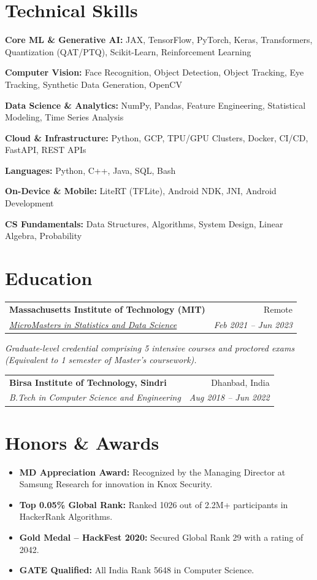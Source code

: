 \documentclass[10pt, letterpaper]{article}
\makeatletter
\newcommand{\resumeItem}[1]{
  \item\small{
    {#1 \vspace{-2pt}}
  }
}
\newcommand{\resumeSubheading}[4]{
  \vspace{-1pt}\item
    \begin{tabular*}{0.98\textwidth}[t]{l@{\extracolsep{\fill}}r}
      \textbf{#1} & {\small\color{darkgray} #2} \\
      \textit{\small#3} & \textit{\small\color{darkgray} #4} \\
    \end{tabular*}\vspace{-7pt}
}
\newcommand{\resumeSubHeadingListStart}{\begin{itemize}[leftmargin=0.15in, label={}]}
\newcommand{\resumeSubHeadingListEnd}{\end{itemize}}
\makeatother
\begin{document}
\section{Technical Skills}
 \begin{itemize}[leftmargin=0.12in, label={}]
    \small{\item{\textbf{Core ML \& Generative AI:} JAX, TensorFlow, PyTorch, Keras, Transformers, Quantization (QAT/PTQ), Scikit-Learn, Reinforcement Learning}}
    \small{\item{\textbf{Computer Vision:} Face Recognition, Object Detection, Object Tracking, Eye Tracking, Synthetic Data Generation, OpenCV}}
    \small{\item{\textbf{Data Science \& Analytics:} NumPy, Pandas, Feature Engineering, Statistical Modeling, Time Series Analysis}}
    \small{\item{\textbf{Cloud \& Infrastructure:} Python, GCP, TPU/GPU Clusters, Docker, CI/CD, FastAPI, REST APIs}}
    \small{\item{\textbf{Languages:} Python, C++, Java, SQL, Bash}}
    \small{\item{\textbf{On-Device \& Mobile:} LiteRT (TFLite), Android NDK, JNI, Android Development}}
    \small{\item{\textbf{CS Fundamentals:} Data Structures, Algorithms, System Design, Linear Algebra, Probability}}
 \end{itemize}

\section{Education}
  \resumeSubHeadingListStart
    \resumeSubheading
      {Massachusetts Institute of Technology (MIT)}{Remote}
      {\href{https://micromasters.mit.edu/ds}{MicroMasters in Statistics and Data Science}}{Feb 2021 -- Jun 2023}
      \vspace{-4pt}
      \small{\item{\textit{Graduate-level credential comprising 5 intensive courses and proctored exams (Equivalent to 1 semester of Master's coursework).}}}
    \resumeSubheading
      {Birsa Institute of Technology, Sindri}{Dhanbad, India}
      {B.Tech in Computer Science and Engineering}{Aug 2018 -- Jun 2022}
  \resumeSubHeadingListEnd

\section{Honors \& Awards}
  \resumeSubHeadingListStart
    \resumeItem{\textbf{MD Appreciation Award:} Recognized by the Managing Director at Samsung Research for innovation in Knox Security.}
    \resumeItem{\textbf{Top 0.05\% Global Rank:} Ranked 1026 out of 2.2M+ participants in HackerRank Algorithms.}
    \resumeItem{\textbf{Gold Medal -- HackFest 2020:} Secured Global Rank 29 with a rating of 2042.}
    \resumeItem{\textbf{GATE Qualified:} All India Rank 5648 in Computer Science.}
  \resumeSubHeadingListEnd
\end{document}
